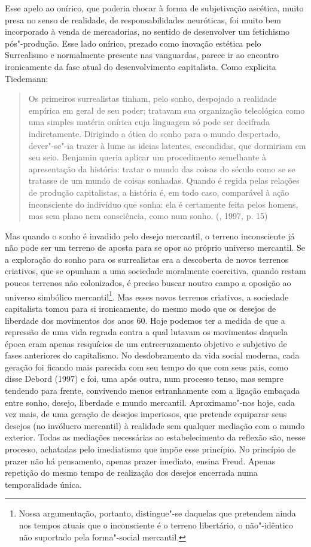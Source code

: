 {Esse apelo ao onírico, que poderia chocar à forma de subjetivação
ascética, muito presa no senso de realidade, de responsabilidades
neuróticas, foi muito bem incorporado à venda de mercadorias, no sentido
de desenvolver um fetichismo pós"-produção. Esse lado onírico, prezado
como inovação estética pelo Surrealismo e normalmente presente nas
vanguardas, parece ir ao encontro ironicamente da fase atual do
desenvolvimento capitalista. Como explicita Tiedemann:

\begin{quote}
Os primeiros surrealistas tinham, pelo sonho, despojado a realidade
empírica em geral de seu poder; tratavam sua organização teleológica
como uma simples matéria onírica cuja linguagem só pode ser decifrada
indiretamente. Dirigindo a ótica do sonho para o mundo despertado,
dever"-se"-ia trazer à lume as ideias latentes, escondidas, que dormiriam
em seu seio. Benjamin queria aplicar um procedimento semelhante à
apresentação da história: tratar o mundo das coisas do século  como
se se tratasse de um mundo de coisas sonhadas. Quando é regida pelas
relações de produção capitalistas, a história é, em todo caso,
comparável à ação inconsciente do indivíduo que sonha: ela é certamente
feita pelos homens, mas sem plano nem consciência, como num sonho.
(, 1997, p. 15)
\end{quote}

Mas quando o sonho é invadido pelo desejo mercantil, o terreno
inconsciente já não pode ser um terreno de aposta para se opor ao
próprio universo mercantil. Se a exploração do sonho para os
surrealistas era a descoberta de novos terrenos criativos, que se
opunham a uma sociedade moralmente coercitiva, quando restam poucos
terrenos não colonizados, é preciso buscar noutro campo a oposição ao
universo simbólico mercantil\footnote{Nossa argumentação, portanto,
  distingue"-se daquelas que pretendem ainda nos tempos atuais que o
  inconsciente é o terreno libertário, o não"-idêntico não suportado pela
  forma"-social mercantil.}. Mas esses novos terrenos criativos, a
sociedade capitalista tomou para si ironicamente, do mesmo modo que os
desejos de liberdade dos movimentos dos anos 60. Hoje podemos ter a
medida de que a repressão de uma vida regrada contra a qual lutavam os
movimentos daquela época eram apenas resquícios de um entrecruzamento
objetivo e subjetivo de fases anteriores do capitalismo. No
desdobramento da vida social moderna, cada geração foi ficando mais
parecida com seu tempo do que com seus pais, como disse Debord (1997) e
foi, uma após outra, num processo tenso, mas sempre tendendo para
frente, convivendo menos estranhamente com a ligação embaçada entre
sonho, desejo, liberdade e mundo mercantil. Aproximamo"-nos hoje, cada
vez mais, de uma geração de desejos imperiosos, que pretende equiparar
seus desejos (no invólucro mercantil) à realidade sem qualquer mediação
com o mundo exterior. Todas as mediações necessárias ao estabelecimento
da reflexão são, nesse processo, achatadas pelo imediatismo que impõe
esse princípio. No princípio de prazer não há pensamento, apenas prazer
imediato, ensina Freud. Apenas repetição do mesmo tempo de realização
dos desejos encerrada numa temporalidade única.

}
